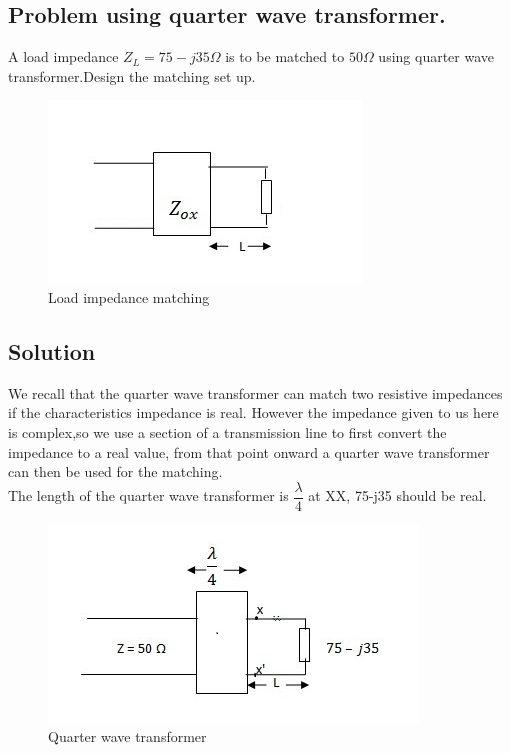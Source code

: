 \begin{example}
\subsection*{Problem using quarter wave transformer.}
A load impedance $Z_{L}=75-j35\Omega$ is to be matched to $50\Omega$ using quarter wave transformer.Design the matching set up. 
\begin{figure}[h]
\centering
\includegraphics[width=1\linewidth]{./graphics/fighalfwave}
\caption{Load impedance matching}
\end{figure}

\subsection*{Solution}
We recall that the quarter wave transformer can match two resistive impedances if the characteristics impedance is real. However the impedance given to us here is complex,so we use a section of a transmission line to first convert the impedance to a real value, from that point onward a quarter wave transformer can then be used for the matching.\\
The length of the quarter wave  transformer is $\dfrac{\lambda}{4}$ at XX, 75-j35 should be real.
\begin{figure}[h]
\centering
\includegraphics[width=1\linewidth]{./graphics/image}
\caption{Quarter wave transformer}
\end{figure}


\end{example}
